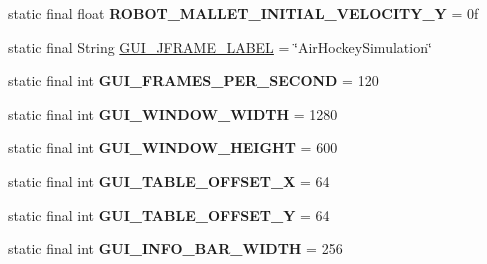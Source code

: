 \begin{DoxyCompactItemize}
\item 
\hypertarget{classairhockeyjava_1_1game_1_1_constants_ac4df41c5c2fed09a73106eca3d77e7a9}{}static final float {\bfseries R\+O\+B\+O\+T\+\_\+\+M\+A\+L\+L\+E\+T\+\_\+\+I\+N\+I\+T\+I\+A\+L\+\_\+\+V\+E\+L\+O\+C\+I\+T\+Y\+\_\+\+Y} = 0f\label{classairhockeyjava_1_1game_1_1_constants_ac4df41c5c2fed09a73106eca3d77e7a9}

\item 
static final String \hyperlink{classairhockeyjava_1_1game_1_1_constants_a594232f8e17c988affdddcf85732f370}{G\+U\+I\+\_\+\+J\+F\+R\+A\+M\+E\+\_\+\+L\+A\+B\+E\+L} = \char`\"{}Air\+Hockey\+Simulation\char`\"{}
\item 
\hypertarget{classairhockeyjava_1_1game_1_1_constants_a74d7587ff8ec29973a185818dce32d34}{}static final int {\bfseries G\+U\+I\+\_\+\+F\+R\+A\+M\+E\+S\+\_\+\+P\+E\+R\+\_\+\+S\+E\+C\+O\+N\+D} = 120\label{classairhockeyjava_1_1game_1_1_constants_a74d7587ff8ec29973a185818dce32d34}

\item 
\hypertarget{classairhockeyjava_1_1game_1_1_constants_a88ead9655d69fb5de3f4e31171bad948}{}static final int {\bfseries G\+U\+I\+\_\+\+W\+I\+N\+D\+O\+W\+\_\+\+W\+I\+D\+T\+H} = 1280\label{classairhockeyjava_1_1game_1_1_constants_a88ead9655d69fb5de3f4e31171bad948}

\item 
\hypertarget{classairhockeyjava_1_1game_1_1_constants_a05da17b163796f7e9c449a74c99b981e}{}static final int {\bfseries G\+U\+I\+\_\+\+W\+I\+N\+D\+O\+W\+\_\+\+H\+E\+I\+G\+H\+T} = 600\label{classairhockeyjava_1_1game_1_1_constants_a05da17b163796f7e9c449a74c99b981e}

\item 
\hypertarget{classairhockeyjava_1_1game_1_1_constants_a3c1b3c51675221db27fbf43db7bcd980}{}static final int {\bfseries G\+U\+I\+\_\+\+T\+A\+B\+L\+E\+\_\+\+O\+F\+F\+S\+E\+T\+\_\+\+X} = 64\label{classairhockeyjava_1_1game_1_1_constants_a3c1b3c51675221db27fbf43db7bcd980}

\item 
\hypertarget{classairhockeyjava_1_1game_1_1_constants_a276e90de955a43456c40458733257807}{}static final int {\bfseries G\+U\+I\+\_\+\+T\+A\+B\+L\+E\+\_\+\+O\+F\+F\+S\+E\+T\+\_\+\+Y} = 64\label{classairhockeyjava_1_1game_1_1_constants_a276e90de955a43456c40458733257807}

\item 
\hypertarget{classairhockeyjava_1_1game_1_1_constants_ab605ab25f776ad5fa69ce888824202dd}{}static final int {\bfseries G\+U\+I\+\_\+\+I\+N\+F\+O\+\_\+\+B\+A\+R\+\_\+\+W\+I\+D\+T\+H} = 256\label{classairhockeyjava_1_1game_1_1_constants_ab605ab25f776ad5fa69ce888824202dd}


\end{DoxyCompactItemize}
